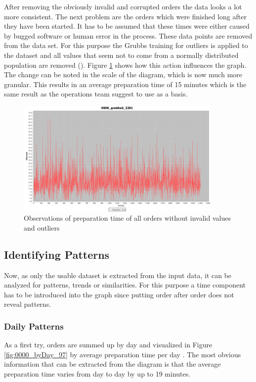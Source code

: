 After removing the obviously invalid and corrupted orders the data looks a lot more consistent. The next problem are the orders which were finished long after they have been started. It has to be assumed that these times were either caused by bugged software or human error in the process. These data points are removed from the data set. For this purpose the Grubbs training for outliers is applied to the dataset and all values that seem not to come from a normally distributed population are removed (\cite{Grubbs}). Figure \ref{fig:0000_grubbed_2201} shows how this action influences the graph. The change can be noted in the scale of the diagram, which is now much more granular. This results in an average preparation time of 15 minutes which is the same result as the operations team suggest to use as a basis.

\begin{figure}[h]
\begin{center}
\includegraphics[width=10cm]{images/0000_grubbed_2201.png}
\caption{Observations of preparation time of all orders without invalid values and outliers}
\label{fig:0000_grubbed_2201}
\end{center}
\end{figure}


\subsection{Identifying Patterns}
Now, as only the usable dataset is extracted from the input data, it can be analyzed for patterns, trends or similarities. For this purpose a time component has to be introduced into the graph since putting order after order does not reveal patterns.
\subsubsection{Daily Patterns}
As a first try, orders are summed up by day and visualized in Figure \ref{fig:0000_byDay_97}  by average preparation time per day . The most obvious information that can be extracted from the diagram is that the average preparation time varies from day to day by up to 19 minutes.


